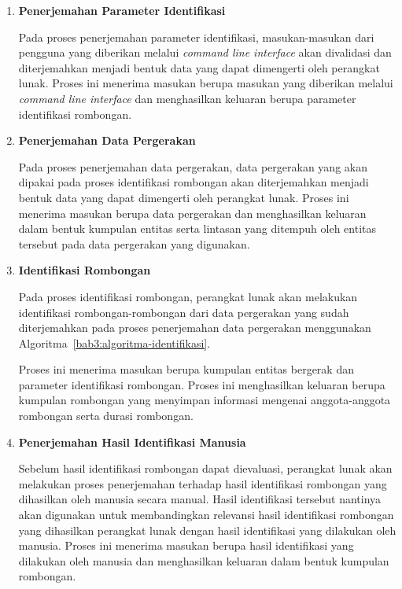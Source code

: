 \begin{enumerate}
    \item \textbf{Penerjemahan Parameter Identifikasi}
    
    Pada proses penerjemahan parameter identifikasi, masukan-masukan dari pengguna yang diberikan melalui \textit{command line interface} akan divalidasi dan diterjemahkan menjadi bentuk data yang dapat dimengerti oleh perangkat lunak. Proses ini menerima masukan berupa masukan yang diberikan melalui \textit{command line interface} dan menghasilkan keluaran berupa parameter identifikasi rombongan.
    
    \item \textbf{Penerjemahan Data Pergerakan}
    
    Pada proses penerjemahan data pergerakan, data pergerakan yang akan dipakai pada proses identifikasi rombongan akan diterjemahkan menjadi bentuk data yang dapat dimengerti oleh perangkat lunak. Proses ini menerima masukan berupa data pergerakan dan menghasilkan keluaran dalam bentuk kumpulan entitas serta lintasan yang ditempuh oleh entitas tersebut pada data pergerakan yang digunakan.
    
    \item \textbf{Identifikasi Rombongan}
    
    Pada proses identifikasi rombongan, perangkat lunak akan melakukan identifikasi rombongan-rombongan dari data pergerakan yang sudah diterjemahkan pada proses penerjemahan data pergerakan menggunakan Algoritma~\ref{bab3:algoritma-identifikasi}.
    
    Proses ini menerima masukan berupa kumpulan entitas bergerak dan parameter identifikasi rombongan. Proses ini menghasilkan keluaran berupa kumpulan rombongan yang menyimpan informasi mengenai anggota-anggota rombongan serta durasi rombongan.
    
    \item \textbf{Penerjemahan Hasil Identifikasi Manusia}
    
    Sebelum hasil identifikasi rombongan dapat dievaluasi, perangkat lunak akan melakukan proses penerjemahan terhadap hasil identifikasi rombongan yang dihasilkan oleh manusia secara manual. Hasil identifikasi tersebut nantinya akan digunakan untuk membandingkan relevansi hasil identifikasi rombongan yang dihasilkan perangkat lunak dengan hasil identifikasi yang dilakukan oleh manusia. Proses ini menerima masukan berupa hasil identifikasi yang dilakukan oleh manusia dan menghasilkan keluaran dalam bentuk kumpulan rombongan.
    

\end{enumerate}
